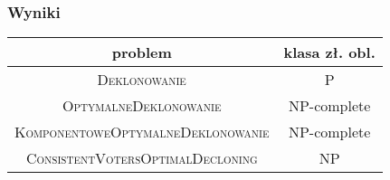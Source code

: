 \documentclass{beamer}
\begin{document}
\begin{frame} \frametitle{Wyniki}


\begin{tabular}{| c | c |}\hline
	\textbf{problem} & \textbf{klasa zł. obl.} \\ \hline
	\textsc{Deklonowanie} & P \\ \hline
	\textsc{OptymalneDeklonowanie} & NP-complete \\ \hline
	\textsc{KomponentoweOptymalneDeklonowanie} & NP-complete \\ \hline
	\textsc{ConsistentVotersOptimalDecloning} & NP \\ \hline
\end{tabular}

\end{frame}

\frame{\titlepage}
\end{document}
